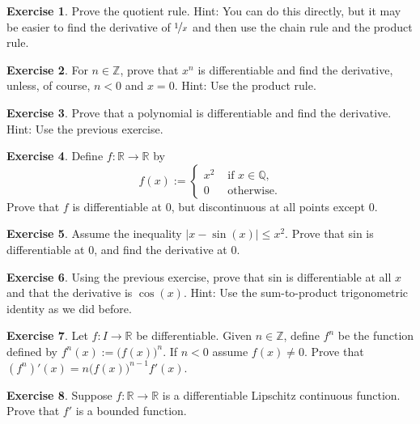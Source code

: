 \documentclass[12pt]{book}
\newcommand{\abs}[1]{\left\lvert {#1} \right\rvert}
\newcommand{\R}{{\mathbb{R}}}
\newcommand{\Z}{{\mathbb{Z}}}
\newcommand{\Q}{{\mathbb{Q}}}
\theoremstyle{plain}
\theoremstyle{remark}
\theoremstyle{definition}
\theoremstyle{exercise}
\newtheorem{exercise}{Exercise}[section]
\theoremstyle{example}
\begin{document}
\begin{exercise}
Prove the quotient rule.  Hint: You can do this directly, but it may be
easier to find the derivative of $\nicefrac{1}{x}$ and then use
the chain rule and the product rule.
\end{exercise}

\begin{exercise} \label{exercise:diffofxn}
For $n \in \Z$,
prove that $x^n$ is differentiable and find the derivative,
unless, of course, $n < 0$ and $x=0$.
Hint: Use the product rule.
\end{exercise}

\begin{exercise}
Prove that a polynomial is differentiable and find the derivative.
Hint: Use the previous exercise.
\end{exercise}

\begin{exercise}
Define $f \colon \R \to \R$ by
\begin{equation*}
f(x) :=
\begin{cases}
x^2 & \text{ if $x \in \Q$,}\\
0 & \text{ otherwise.}
\end{cases}
\end{equation*}
Prove that $f$ is differentiable at $0$, but discontinuous at all points
except $0$.
\end{exercise}

\begin{exercise}
Assume the inequality $\abs{x-\sin(x)} \leq x^2$.  Prove that sin is
differentiable at $0$, and find the derivative at $0$.
\end{exercise}

\begin{exercise}
Using the previous exercise, prove that sin is differentiable at all $x$
and that the derivative is $\cos(x)$.  Hint: Use the sum-to-product
trigonometric identity as we did before.
\end{exercise}

\begin{exercise}
Let $f \colon I \to \R$ be differentiable.  Given $n \in \Z$, define $f^n$
be the function defined by $f^n(x) := {\bigl( f(x) \bigr)}^n$.  If
$n < 0$ assume $f(x) \not= 0$.  Prove that
$(f^n)'(x) = n {\bigl(f(x) \bigr)}^{n-1} f'(x)$.
\end{exercise}

\begin{exercise}
Suppose $f \colon \R \to \R$ is a differentiable
Lipschitz continuous function.
Prove that $f'$ is a bounded function.
\end{exercise}
\end{document}

